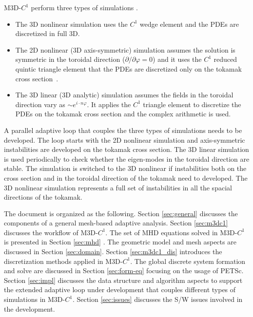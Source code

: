 \documentclass[11pt]{article}  %
\begin{document}
M3D-$C^1$ perform three types of simulations \cite{Jardin2014Extend}. 
\begin{itemize}
\item The 3D nonlinear simulation uses the $C^1$ wedge element \cite{jardin2012multiple} and the PDEs are discretized in full 3D.  
\item The 2D nonlinear (3D axis-symmetric) simulation assumes the solution is symmetric in the toroidal direction ($\partial/\partial \varphi =0$) and it uses the $C^1$ reduced quintic triangle element  \cite{jardin2004triangular} that the PDEs are discretized only on the tokamak cross section~\cite{wesson2011tokamaks,stacey1982fusion}. 
\item The 3D linear (3D analytic) simulation assumes the fields in the toroidal direction vary as $\sim e^{i\cdot n\varphi}$. It applies the $C^1$ triangle element to discretize the PDEs on the tokamak cross section and  the complex arithmetic is used.
\end{itemize}

A parallel adaptive loop that couples the three types of simulations needs to be developed. The loop starts with the 2D nonlinear simulation and  axis-symmetric instabilities are developed on the tokamak cross section.  The 3D linear simulation is used periodically to check  whether the eigen-modes in the toroidal direction are stable. The simulation is switched to the 3D nonlinear if instabilities both on the cross section and in the toroidal direction of the tokamak need to developed.  The 3D nonlinear simulation represents a full set of instabilities in all the spacial directions of the tokamak.

The document is organized as the following. Section \ref{sec:general} discusses the  components of a general mesh-based adaptive analysis. Section \ref{sec:m3dc1} discusses the  workflow of M3D-$C^1$. The set of MHD equations solved  in M3D-$C^1$ is presented in Section \ref{sec:mhd} . The geometric model and mesh aspects are discussed in Section \ref{sec:domain}. Section  \ref{sec:m3dc1_dis} introduces the discretization methods applied in M3D-$C^1$.  The global discrete system formation and solve are discussed in Section \ref{sec:form-eq} focusing on the usage of PETSc. Section \ref{sec:impl} discusses the data structure and algorithm aspects to support the  extended adaptive loop under development that couples different types of simulations in M3D-$C^1$.  Section \ref{sec:issues} discusses the S/W issues involved in the development.  
\end{document}
